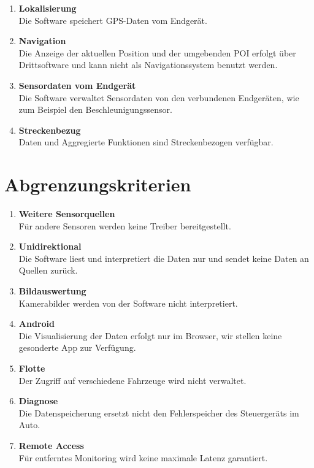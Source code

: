 \documentclass[pflichtenheft.tex]{subfiles}
\begin{document}
\begin{enumerate}
	\item{\textbf{Lokalisierung}}\\Die Software speichert GPS-Daten vom Endgerät.

	\item{\textbf{Navigation}}\\Die Anzeige der aktuellen Position und der umgebenden POI erfolgt über Drittsoftware und kann nicht als Navigationssystem benutzt werden.

	\item{\textbf{Sensordaten vom Endgerät}}\\Die Software verwaltet Sensordaten von den verbundenen Endgeräten, wie zum Beispiel den Beschleunigungssensor.

	\item{\textbf{Streckenbezug}} \\Daten und Aggregierte Funktionen sind Streckenbezogen verfügbar.

\end{enumerate}

\renewcommand{\theenumi}{/AK\ifnum \value{enumi}<10 0\fi\arabic{enumi}0/}
\renewcommand{\labelenumi}{\theenumi}
\renewcommand{\theenumii}{\arabic{enumii}}
\renewcommand{\labelenumii}{/AK\ifnum \value{enumi}<10 0\fi\arabic{enumi}\arabic{enumii}/}

\section{Abgrenzungskriterien}

\begin{enumerate}
	\item{\textbf{Weitere Sensorquellen}} \\Für andere Sensoren werden keine Treiber bereitgestellt.

	\item{\textbf{Unidirektional}} \\Die Software liest und interpretiert die Daten nur und sendet keine Daten an Quellen zurück.

	\item{\textbf{Bildauswertung}} \\Kamerabilder werden von der Software nicht interpretiert.

	\item{\textbf{Android}} \\Die Visualisierung der Daten erfolgt nur im Browser, wir stellen keine gesonderte App zur Verfügung.

	\item{\textbf{Flotte}} \\Der Zugriff auf verschiedene Fahrzeuge wird nicht verwaltet.

	\item{\textbf{Diagnose}} \\Die Datenspeicherung ersetzt nicht den Fehlerspeicher des Steuergeräts im Auto.

	\item{\textbf{Remote Access}} \\Für entferntes Monitoring wird keine maximale Latenz garantiert.

\end{enumerate}
\end{document}
